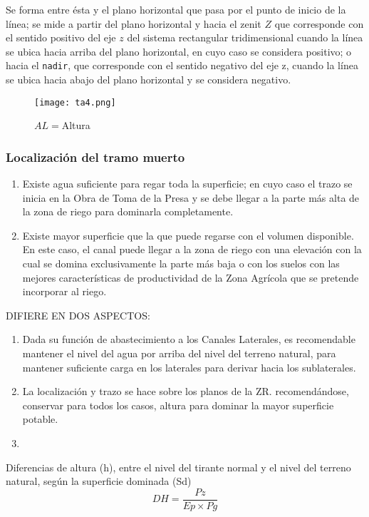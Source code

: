 \begin{definition}
    Se forma entre ésta y el plano horizontal que pasa por el punto de inicio de la línea; se mide a partir del plano horizontal y hacia el zenit $Z$ que corresponde con el sentido positivo del eje $z$ del sistema rectangular tridimensional cuando la línea se ubica hacia arriba del plano horizontal, en cuyo caso se considera positivo; o hacia el \texttt{nadir}, que corresponde con el sentido negativo del eje z, cuando la línea se ubica hacia abajo del plano horizontal y se considera negativo.
\end{definition}

\begin{figure}[h!]
  \centerline{\texttt{[image: ta4.png]}}
  \caption{$AL=$Altura}
  \label{ta4}
\end{figure}
\subsubsection{Localización del tramo muerto}
\begin{enumerate}
    \item Existe agua suficiente para regar toda la superficie; en cuyo caso el trazo se inicia en la Obra de Toma de la Presa y se debe llegar a la parte más alta de la zona de riego para dominarla completamente.
    \item Existe mayor superficie que la que puede regarse con el volumen disponible. En este caso, el canal puede llegar a la zona de riego con una elevación con la cual se domina exclusivamente la parte más baja o con los suelos con las mejores características de productividad de la Zona Agrícola que se pretende incorporar al riego.
\end{enumerate}

DIFIERE EN DOS ASPECTOS:
\begin{enumerate}
    \item Dada su función de abastecimiento a los Canales Laterales, es recomendable mantener el nivel del agua por arriba del nivel del terreno natural, para mantener suficiente carga en los laterales para derivar hacia los sublaterales.
    \item La localización y trazo se hace sobre los planos de la ZR. recomendándose, conservar para todos los casos, altura para dominar la mayor superficie potable.
    \item 
\end{enumerate}

Diferencias de altura (h), entre el nivel del tirante normal y el nivel del terreno natural, según la superficie dominada (Sd)
\begin{equation}
    DH = \frac{Pz}{Ep \times Pg}
\end{equation}

